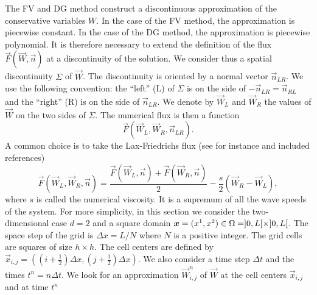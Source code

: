\documentclass{svmult}
\begin{document}
The FV and DG method construct a discontinuous approximation of the
conservative variables $W$. In the case of the FV method, the
approximation is piecewise constant. In the case of the DG method, the
approximation is piecewise polynomial. It is therefore necessary to
extend the definition of the flux $\vec{F}(\vec{W},\vec{n})$ at a
discontinuity of the solution. We consider thus a spatial
discontinuity $\Sigma$ of $\vec{W}$. The discontinuity is oriented by
a normal vector $\vec{n}_{LR}$. We use the following convention: the
``left'' (L) of $\Sigma$ is on the side of
$-\vec{n}_{LR}=\vec{n}_{RL}$ and the ``right'' (R) is on the side of
$\vec{n}_{LR}$. We denote by $\vec{W}_L$ and $\vec{W}_R$ the values of
$\vec{W}$ on the two sides of $\Sigma$. The numerical flux is then a
function
\begin{equation}
  \vec{F}(\vec{W}_L,\vec{W}_R,\vec{n}_{LR}).
\end{equation}
A common choice is to take the Lax-Friedrichs flux (see for instance
\cite{leveque2002finite} and included references)
\begin{equation}
  \vec{F}(\vec{W}_L,\vec{W}_R,\vec{n})
  =\frac{\vec{F}(\vec{W}_L,\vec{n})
    +\vec{F}(\vec{W}_R,\vec{n})}{2}-\frac{s}{2}(\vec{W}_R-\vec{W}_L),
\end{equation}
where $s$ is called the numerical viscosity. It is a supremum of all
the wave speeds of the system.  For more simplicity, in this section
we consider the two-dimensional case $d=2$ and a square domain
$\vec{x}=(x^1,x^2)\in \Omega=\open{0}{L}\times\open{0}{L}$. The space
step of the grid is $\Delta x=L/N$ where $N$ is a positive
integer. The grid cells are squares of size $h\times h$. The cell
centers are defined by $\vec{x}_{i,j}=((i+\frac{1}{2})\Delta
x,(j+\frac{1}{2})\Delta x)$. We also consider a time step $\Delta t$
and the times $t^n=n\Delta t$. We look for an approximation
$\vec{W}^n_{i,j}$ of $\vec{W}$ at the cell centers $\vec{x}_{i,j}$ and
at time $t^n$
\end{document}
